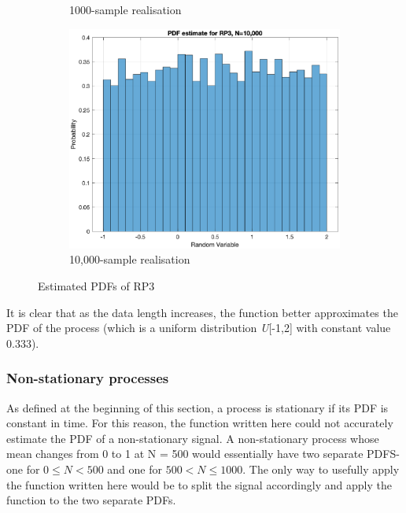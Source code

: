 \begin{figure}[H]
\begin{subfigure}{.32\textwidth}
  \caption{1000-sample realisation}
\end{subfigure}
\begin{subfigure}{.32\textwidth}
  \centering
  \includegraphics[width=\linewidth]{assignment1figs/rp310000}  
  \caption{10,000-sample realisation}
\end{subfigure}
\caption{Estimated PDFs of RP3}
\label{fig:rps}
\end{figure}
\noindent
It is clear that as the data length increases, the function better approximates the PDF of the process (which is a uniform distribution \textit{U}[-1,2] with constant value 0.333).

\subsubsection{Non-stationary processes}

As defined at the beginning of this section, a process is stationary if its PDF is constant in time. For this reason, the function written here could not accurately estimate the PDF of a non-stationary signal. A non-stationary process whose mean changes from 0 to 1 at N = 500 would essentially have two separate PDFS- one for $0\leq N < 500$ and one for $500 < N \leq 1000$. The only way to usefully apply the function written here would be to split the signal accordingly and apply the function to the two separate PDFs.
